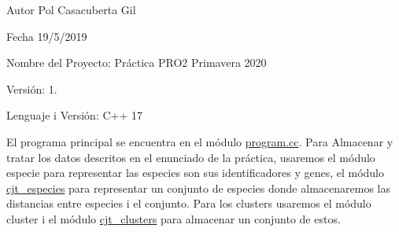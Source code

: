 \begin{DoxyAuthor}{Autor}
Pol Casacuberta Gil 
\end{DoxyAuthor}
\begin{DoxyDate}{Fecha}
19/5/2019
\end{DoxyDate}
Nombre del Proyecto\+: Práctica PRO2 Primavera 2020

Versión\+: 1.

Lenguaje i Versión\+: C++ 17

El programa principal se encuentra en el módulo \mbox{\hyperlink{program_8cc}{program.\+cc}}. Para Almacenar y tratar los datos descritos en el enunciado de la práctica, usaremos el módulo especie para representar las especies son sus identificadores y genes, el módulo \mbox{\hyperlink{classcjt__especies}{cjt\+\_\+especies}} para representar un conjunto de especies donde almacenaremos las distancias entre especies i el conjunto. Para los clusters usaremos el módulo cluster i el módulo \mbox{\hyperlink{classcjt__clusters}{cjt\+\_\+clusters}} para almacenar un conjunto de estos. 